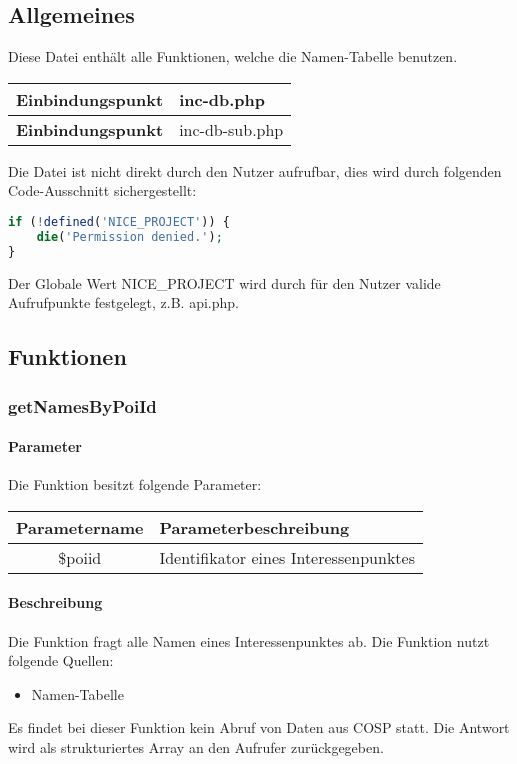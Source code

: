 \subsection{Allgemeines} Diese Datei enthält alle Funktionen, welche die Namen-Tabelle benutzen.
\begin{table}[H]
	\begin{tabular}{|c|p{11cm}|}
		\hline
		\textbf{Einbindungspunkt} & inc-db.php \\ \hline
		\textbf{Einbindungspunkt} & inc-db-sub.php \\ \hline
	\end{tabular}
\end{table}
Die Datei ist nicht direkt durch den Nutzer aufrufbar, dies wird durch folgenden Code-Ausschnitt sichergestellt:
\begin{lstlisting}[language=php]
if (!defined('NICE_PROJECT')) {
	die('Permission denied.');
}
\end{lstlisting}
Der Globale Wert {\glqq NICE\_PROJECT\grqq} wird durch für den Nutzer valide Aufrufpunkte festgelegt, z.B. {\glqq api.php\grqq}.
\newpage
\subsection{Funktionen}
\subsubsection{getNamesByPoiId}
\paragraph{Parameter} Die Funktion besitzt folgende Parameter:
\begin{table}[H]
	\begin{tabular}{|c|p{11cm}|}
		\hline
		\textbf{Parametername} & \textbf{Parameterbeschreibung} \\ \hline
		\$poiid & Identifikator eines Interessenpunktes \\ \hline
	\end{tabular}
\end{table}
\paragraph{Beschreibung} Die Funktion fragt alle Namen eines Interessenpunktes ab. Die Funktion nutzt folgende Quellen:
\begin{itemize}
	\item Namen-Tabelle
\end{itemize}
Es findet bei dieser Funktion kein Abruf von Daten aus {\glqq COSP\grqq} statt. Die Antwort wird als strukturiertes Array an den Aufrufer zurückgegeben.
